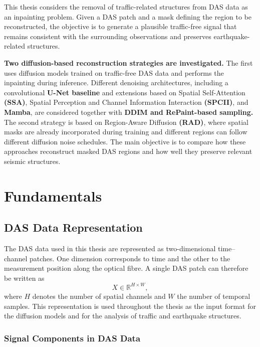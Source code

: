 \documentclass[english,ba]{tudo-sse-thesis}
\begin{document}
This thesis considers the removal of traffic-related structures from DAS data as an inpainting problem. Given a DAS patch and a mask defining the region to be reconstructed, the objective is to generate a plausible traffic-free signal that remains consistent with the surrounding observations and preserves earthquake-related structures.

\textbf{Two diffusion-based reconstruction strategies are investigated.} The first uses diffusion models trained on traffic-free DAS data and performs the inpainting during inference. Different denoising architectures, including a convolutional \textbf{U-Net baseline} and extensions based on Spatial Self-Attention \textbf{(SSA)}, Spatial Perception and Channel Information Interaction \textbf{(SPCII)}, and \textbf{Mamba}, are considered together with \textbf{DDIM and RePaint-based sampling.} The second strategy is based on Region-Aware Diffusion \textbf{(RAD)}, where spatial masks are already incorporated during training and different regions can follow different diffusion noise schedules. The main objective is to compare how these approaches reconstruct masked DAS regions and how well they preserve relevant seismic structures.


\chapter{Fundamentals}

\section{DAS Data Representation}

The DAS data used in this thesis are represented as two-dimensional
time--channel patches. One dimension corresponds to time and the other
to the measurement position along the optical fibre. A single DAS patch
can therefore be written as
\begin{equation}
    X \in \mathbb{R}^{H \times W},
\end{equation}
where \(H\) denotes the number of spatial channels and \(W\) the number
of temporal samples.
This representation is used throughout the thesis as the input format for
the diffusion models and for the analysis of traffic and earthquake
structures.

\subsection{Signal Components in DAS Data}
\end{document}
